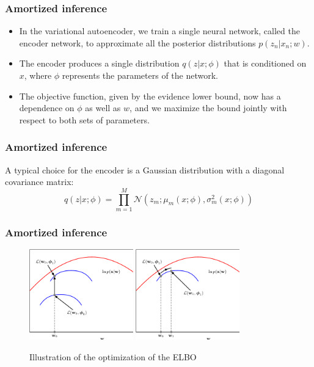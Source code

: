 \documentclass{beamer}
\begin{document}
\begin{frame}
    \frametitle{Amortized inference}
    \begin{itemize}
        \item In the variational autoencoder, we train a single neural network, called the encoder network, to approximate all the posterior distributions $p(z_{n}|x_{n};w)$.
        \item The encoder produces a single distribution $q(z|x;\phi)$ that is conditioned on $x$, where $\phi$ represents the parameters of the network.
        \item The objective function, given by the evidence lower bound, now has a dependence on $\phi$ as well as $w$, and we maximize the bound jointly with respect to both sets of parameters.
    \end{itemize}
\end{frame}

\begin{frame}
    \frametitle{Amortized inference}
    A typical choice for the encoder is a Gaussian distribution with a diagonal covariance matrix:
    \begin{equation*}
        q(z|x;\phi)=\prod_{m=1}^{M}\mathcal{N}(z_{m};\mu_{m}(x;\phi),\sigma^{2}_{m}(x;\phi))
    \end{equation*}
\end{frame}

\begin{frame}
    \frametitle{Amortized inference}
    \begin{figure}
        \caption{Illustration of the optimization of the ELBO}
        \includegraphics[width=0.4\textwidth]{Figure_8_a.pdf}
        \includegraphics[width=0.4\textwidth]{Figure_8_b.pdf}
    \end{figure}
\end{frame}
\end{document}
